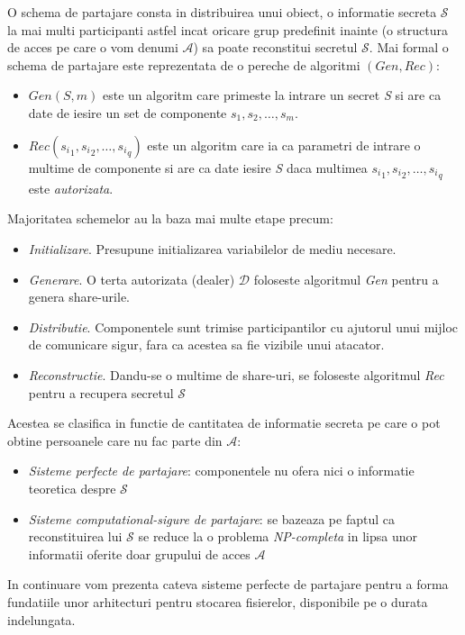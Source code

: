 \documentclass{llncs}
\begin{document}
O schema de partajare consta in distribuirea unui obiect, o informatie secreta $\mathcal{S}$ la mai multi participanti astfel incat oricare grup predefinit inainte (o structura de acces pe care o vom denumi $\mathcal{A}$) sa poate reconstitui secretul $\mathcal{S}$.
Mai formal o schema de partajare este reprezentata de o pereche de algoritmi \textbf{$(Gen, Rec)$}:
\begin{itemize}
	\item \textit{$Gen(S, m)$} este un algoritm care primeste la intrare un secret \textit{S} si are ca date de iesire un set de componente
	${s_1, s_2, \dots, s_m}$.
	\item \textit{$Rec({s_i}_1, {s_i}_2, \dots, {s_i}_q)$} este un algoritm care ia ca parametri de intrare o multime de componente si are ca date iesire
	\textit{S} daca multimea ${{s_i}_1, {s_i}_2, \dots, {s_i}_q}$ este \textit{autorizata}. \cite{Olimid:2013}
\end{itemize} 
Majoritatea schemelor au la baza mai multe etape precum:
\begin{itemize}
	\item \textit{Initializare}. Presupune initializarea variabilelor de mediu necesare.
	\item \textit{Generare}. O terta autorizata (dealer) $\mathcal{D}$ foloseste algoritmul \textit{Gen} pentru a genera share-urile.
	\item \textit{Distributie}. Componentele sunt trimise participantilor cu ajutorul unui mijloc de comunicare sigur, fara ca acestea sa fie vizibile unui atacator.
	\item \textit{Reconstructie}. Dandu-se o multime de share-uri, se foloseste algoritmul \textit{Rec} pentru a recupera secretul $\mathcal{S}$
\end{itemize}
Acestea se clasifica in functie de cantitatea de informatie secreta pe care o pot obtine persoanele care nu fac parte din $\mathcal{A}$:
\begin{itemize}
	\item \textit{Sisteme perfecte de partajare}: componentele nu ofera nici o informatie teoretica despre $\mathcal{S}$
	\item \textit{Sisteme computational-sigure de partajare}: se bazeaza pe faptul ca reconstituirea lui $\mathcal{S}$ se reduce la o problema \textit{NP-completa} in lipsa unor informatii oferite doar grupului de acces $\mathcal{A}$
\end{itemize} %
In continuare vom prezenta cateva sisteme perfecte de partajare pentru a forma fundatiile unor arhitecturi pentru stocarea fisierelor, disponibile pe o durata indelungata.
\end{document}
